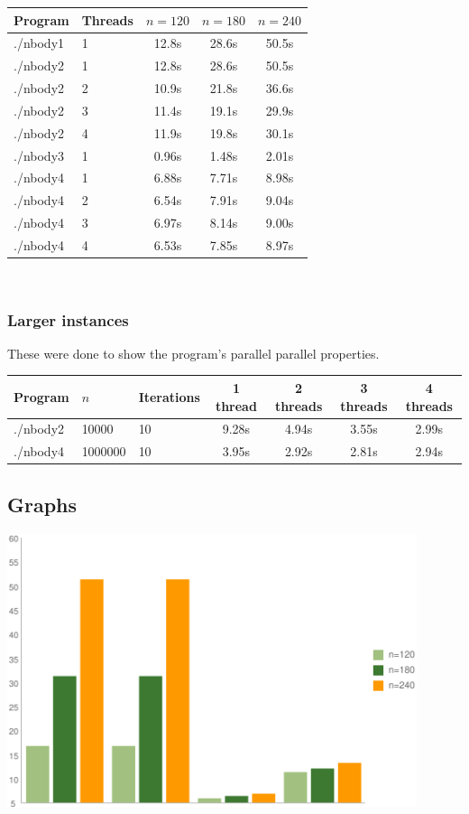 \documentclass[a4paper] {article}
\begin{document}
\begin{tabular} { |l|l||c|c|c| }
	\hline
	Program & Threads & $n=120$ & $n=180$ & $n=240$ \\
	\hline
	\hline
	./nbody1 & 1 & 12.8s & 28.6s & 50.5s \\
	\hline
	\hline
	./nbody2 & 1 & 12.8s & 28.6s & 50.5s \\
	\hline
	./nbody2 & 2 & 10.9s & 21.8s & 36.6s \\
	\hline
	./nbody2 & 3 & 11.4s & 19.1s & 29.9s \\
	\hline
	./nbody2 & 4 & 11.9s & 19.8s & 30.1s \\
	\hline
	\hline
	./nbody3 & 1 & 0.96s & 1.48s & 2.01s \\
	\hline
	\hline
	./nbody4 & 1 & 6.88s & 7.71s & 8.98s \\
	\hline
	./nbody4 & 2 & 6.54s & 7.91s & 9.04s \\
	\hline
	./nbody4 & 3 & 6.97s & 8.14s & 9.00s \\
	\hline
	./nbody4 & 4 & 6.53s & 7.85s & 8.97s \\
	\hline
\end{tabular}\\

\subsubsection{Larger instances}

These were done to show the program's parallel parallel properties.\\

\begin{tabular} { |l|l|l||c|c|c|c| }
	\hline
	Program & $n$ & Iterations & 1 thread & 2 threads & 3 threads & 4 threads \\
	\hline
	\hline
	./nbody2 & 10000 & 10 & 9.28s & 4.94s & 3.55s & 2.99s\\
	\hline
	./nbody4 & 1000000 & 10 & 3.95s & 2.92s & 2.81s & 2.94s\\
	\hline
\end{tabular}

\subsection{Graphs}

\includegraphics[width=120mm]{graph-onethread}
\end{document}

